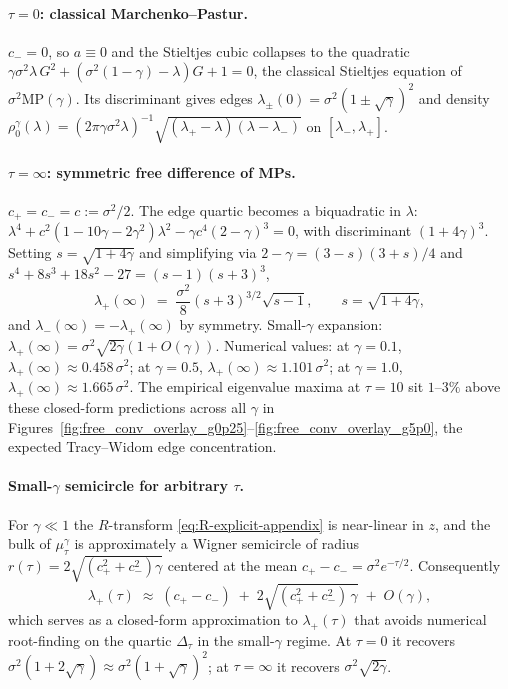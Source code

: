 \documentclass{article}
\begin{document}
\paragraph{$\tau = 0$: classical Marchenko--Pastur.} $c_-=0$, so
$a\equiv 0$ and the Stieltjes cubic collapses to the quadratic
$\gamma\sigma^2\lambda\,G^2 + (\sigma^2(1-\gamma) - \lambda)G + 1 = 0$,
the classical Stieltjes equation of $\sigma^2\mathrm{MP}(\gamma)$. Its
discriminant gives edges $\lambda_\pm(0) = \sigma^2(1 \pm \sqrt\gamma)^2$
and density
$\rho_0^\gamma(\lambda) = (2\pi\gamma\sigma^2\lambda)^{-1}\sqrt{(\lambda_+-\lambda)(\lambda-\lambda_-)}$
on $[\lambda_-, \lambda_+]$.

\paragraph{$\tau = \infty$: symmetric free difference of MPs.}
$c_+ = c_- = c := \sigma^2/2$. The edge quartic becomes a biquadratic
in $\lambda$: $\lambda^4 + c^2(1 - 10\gamma - 2\gamma^2)\lambda^2 - \gamma c^4(2-\gamma)^3 = 0$,
with discriminant $(1+4\gamma)^3$. Setting $s = \sqrt{1+4\gamma}$ and
simplifying via $2-\gamma = (3-s)(3+s)/4$ and
$s^4 + 8s^3 + 18s^2 - 27 = (s-1)(s+3)^3$,
\begin{equation}
\boxed{\;\lambda_+(\infty) \;=\; \frac{\sigma^2}{8}(s+3)^{3/2}\sqrt{s-1}, \qquad s = \sqrt{1+4\gamma},\;}
\label{eq:edge-tauinf-appendix}
\end{equation}
and $\lambda_-(\infty) = -\lambda_+(\infty)$ by symmetry. Small-$\gamma$
expansion: $\lambda_+(\infty) = \sigma^2\sqrt{2\gamma}(1 + O(\gamma))$.
Numerical values: at $\gamma = 0.1$, $\lambda_+(\infty) \approx 0.458\,\sigma^2$;
at $\gamma = 0.5$, $\lambda_+(\infty) \approx 1.101\,\sigma^2$;
at $\gamma = 1.0$, $\lambda_+(\infty) \approx 1.665\,\sigma^2$. The
empirical eigenvalue maxima at $\tau = 10$ sit $1\text{--}3\%$ above these closed-form predictions across all $\gamma$ in Figures~\ref{fig:free_conv_overlay_g0p25}--\ref{fig:free_conv_overlay_g5p0}, the expected Tracy--Widom edge concentration.

\paragraph{Small-$\gamma$ semicircle for arbitrary $\tau$.}
For $\gamma \ll 1$ the $R$-transform \eqref{eq:R-explicit-appendix} is
near-linear in $z$, and the bulk of $\mu_\tau^\gamma$ is approximately a
Wigner semicircle of radius $r(\tau) = 2\sqrt{(c_+^2 + c_-^2)\gamma}$
centered at the mean $c_+ - c_- = \sigma^2 e^{-\tau/2}$. Consequently
\begin{equation}
\lambda_+(\tau) \;\approx\; (c_+ - c_-) \;+\; 2\sqrt{(c_+^2 + c_-^2)\,\gamma} \;+\; O(\gamma),
\label{eq:edge-small-gamma-appendix}
\end{equation}
which serves as a closed-form approximation to $\lambda_+(\tau)$ that
avoids numerical root-finding on the quartic $\Delta_\tau$ in the
small-$\gamma$ regime. At $\tau=0$ it recovers
$\sigma^2(1+2\sqrt\gamma) \approx \sigma^2(1+\sqrt\gamma)^2$; at
$\tau=\infty$ it recovers $\sigma^2\sqrt{2\gamma}$.
\end{document}
